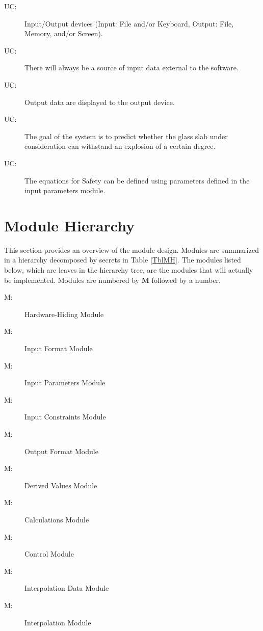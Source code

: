 \documentclass[12pt]{article}
\newcounter{ucnum}
\newcommand{\uctheucnum}{UC\theucnum}
\newcounter{mnum}
\newcommand{\mthemnum}{M\themnum}
\begin{document}
\begin{description}
\item[ \uctheucnum \label{ucIO}:] Input/Output devices
  (Input: File and/or Keyboard, Output: File, Memory, and/or Screen).
\item[ \uctheucnum \label{ucInput}:] There will always be
  a source of input data external to the software.
\item[ \uctheucnum \label{ucOutput}:] Output data are
  displayed to the output device.
\item[ \uctheucnum \label{ucGoal}:] The goal of the system
  is to predict whether the glass slab under consideration can withstand an 
  explosion of a certain degree.
\item[ \uctheucnum \label{ucODEstructure}:] The 
equations for Safety can be defined using parameters defined in the input parameters 
module.

\end{description}

\section{Module Hierarchy} \label{SecMH}


This section provides an overview of the module design. Modules are summarized
in a hierarchy decomposed by secrets in Table \ref{TblMH}. The modules listed
below, which are leaves in the hierarchy tree, are the modules that will
actually be implemented.  Modules are numbered by \textbf{M}
followed by a number.

\begin{description}
\item [ \mthemnum \label{mHH}:] Hardware-Hiding Module
\item [ \mthemnum \label{mInput}:] Input Format Module
\item [ \mthemnum \label{mParams}:] Input Parameters Module
\item [ \mthemnum \label{mConstraints}:] Input 
	Constraints Module
\item [ \mthemnum \label{mOutput}:] Output Format Module
\item [ \mthemnum \label{mDerVal}:]  Derived Values Module
\item [ \mthemnum \label{mCalc}:]  Calculations Module
\item[ \mthemnum \label{mControl}:]  Control Module
\item [ \mthemnum \label{mIntData}:] Interpolation Data 
	Module
\item [ \mthemnum \label{mInt}:] Interpolation Module

\end{description}
\end{document}
